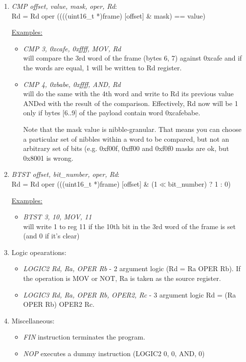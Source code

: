 \begin{enumerate}
  \item \emph{CMP offset, value, mask, oper, Rd}:\\
    Rd = Rd oper ((((uint16\_t *)frame) [offset] \& mask) == value)
    
    \underline{Examples:}
    \begin{itemize}
      \item \emph{CMP 3, 0xcafe, 0xffff, MOV, Rd}\\
            will compare the 3rd word of the frame (bytes 6, 7) against 0xcafe
            and if the words are equal, 1 will be written to Rd register.
      \item \emph{CMP 4, 0xbabe, 0xffff, AND, Rd}\\
            will do the same with the 4th word and write to Rd its previous
            value ANDed with the result of the comparison. Effectively, Rd now
            will be 1 only if bytes [6..9] of the payload contain word
            0xcafebabe.
    
            Note that the mask value is nibble-granular. That means you can
            choose a particular set of nibbles within a word to be compared, but
            not an arbitrary set of bits (e.g. 0xf00f, 0xff00 and 0xf0f0 masks
            are ok, but 0x8001 is wrong.
    \end{itemize}

  \item \emph{BTST offset, bit\_number, oper, Rd}:\\
    Rd = Rd oper (((uint16\_t *)frame) [offset] \& (1$\ll$bit\_number) ? 1 : 0)

    \underline{Examples:}
    \begin{itemize}
      \item \emph{BTST 3, 10, MOV, 11}\\
            will write 1 to reg 11 if the 10th bit in the 3rd word of the frame 
            is set (and 0 if it's clear)
    \end{itemize}

  \item Logic opearations:
    \begin{itemize}
      \item \emph{LOGIC2 Rd, Ra, OPER Rb} - 2 argument logic (Rd = Ra OPER Rb). If the
            operation is MOV or NOT, Ra is taken as the source register.
      \item \emph{LOGIC3 Rd, Ra, OPER Rb, OPER2, Rc} - 3 argument logic Rd = (Ra
            OPER Rb) OPER2 Rc.
    \end{itemize}

  \item Miscellaneous:
    \begin{itemize}
      \item \emph{FIN} instruction terminates the program.
      \item \emph{NOP} executes a dummy instruction (LOGIC2 0, 0, AND, 0)
    \end{itemize}
\end{enumerate}

